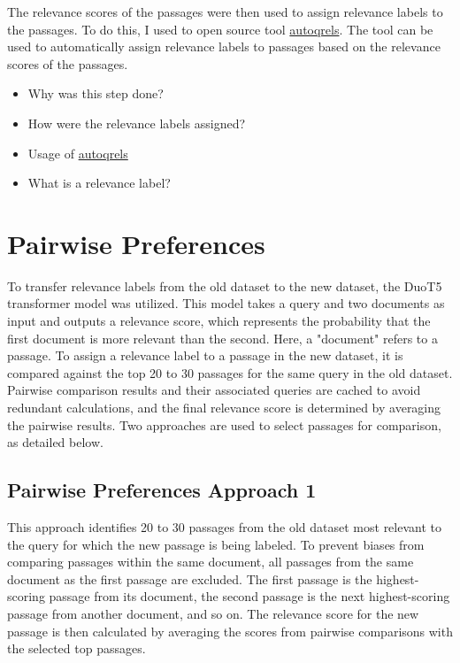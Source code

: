 The relevance scores of the passages were then used to assign relevance labels to the passages. To do this, I used to open source tool \href{https://github.com/seanmacavaney/autoqrels}{autoqrels}. The tool can be used to automatically assign relevance labels to passages based on the relevance scores of the passages.

\begin{itemize}
    \item Why was this step done?
    \item How were the relevance labels assigned?
    \item Usage of \href{https://github.com/seanmacavaney/autoqrels}{autoqrels}
    \item What is a relevance label?
\end{itemize}


\section{Pairwise Preferences}\label{pairwise-transfering-relevance-labels-across-datasets}

To transfer relevance labels from the old dataset to the new dataset, the DuoT5 transformer model was utilized. This model takes a query and two documents as input and outputs a relevance score, which represents the probability that the first document is more relevant than the second. Here, a "document" refers to a passage. To assign a relevance label to a passage in the new dataset, it is compared against the top 20 to 30 passages for the same query in the old dataset. Pairwise comparison results and their associated queries are cached to avoid redundant calculations, and the final relevance score is determined by averaging the pairwise results. Two approaches are used to select passages for comparison, as detailed below.

\subsection{Pairwise Preferences Approach 1}\label{pairwise-preferences-approach-1}

This approach identifies 20 to 30 passages from the old dataset most relevant to the query for which the new passage is being labeled. To prevent biases from comparing passages within the same document, all passages from the same document as the first passage are excluded. The first passage is the highest-scoring passage from its document, the second passage is the next highest-scoring passage from another document, and so on. The relevance score for the new passage is then calculated by averaging the scores from pairwise comparisons with the selected top passages.

